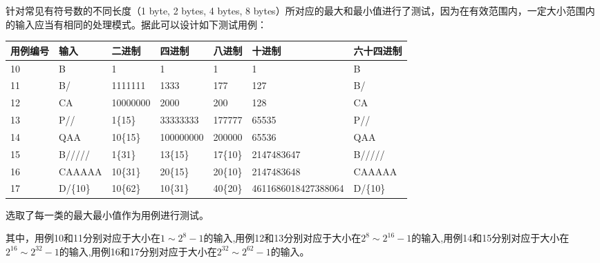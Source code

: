 \documentclass[12pt, a4paper, oneside]{ctexart}
\begin{document}
针对常见有符号数的不同长度（1 byte, 2 bytes, 4 bytes, 8 bytes）所对应的最大和最小值进行了测试，因为在有效范围内，一定大小范围内的输入应当有相同的处理模式。据此可以设计如下测试用例：

\begin{table}[!h]
    \small
    \begin{tabular}{|l|l|l|l|l|l|l|}
    \hline
    用例编号 & 输入 & 二进制 & 四进制 & 八进制 & 十进制 & 六十四进制\\ \hline
    10 & B & 1 & 1 & 1 & 1 & B \\ \hline
    11 & B/ & 1111111 & 1333 & 177 & 127 & B/ \\ \hline
    12 & CA & 10000000 & 2000 & 200 & 128 & CA \\ \hline
    13 & P// & 1\{15\} & 33333333 & 177777 & 65535 & P// \\ \hline
    14 & QAA & 10\{15\} & 100000000 & 200000 & 65536 & QAA \\ \hline
    15 & B///// & 1\{31\} & 13\{15\} & 17\{10\} & 2147483647 & B/////\\ \hline
    16 & CAAAAA & 10\{31\} & 20\{15\} & 20\{10\} & 2147483648 & CAAAAA \\ \hline
    17 & D/\{10\} & 10\{62\} & 10\{31\} & 40\{20\} & 4611686018427388064 & D/\{10\} \\ \hline
    \end{tabular}
\end{table}
选取了每一类的最大最小值作为用例进行测试。

其中，用例10和11分别对应于大小在$1\sim2^{8}-1$的输入,用例12和13分别对应于大小在$2^{8}\sim2^{16}-1$的输入,用例14和15分别对应于大小在$2^{16}\sim2^{32}-1$的输入,用例16和17分别对应于大小在$2^{32}\sim2^{62}-1$的输入。
\end{document}
